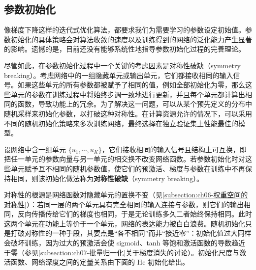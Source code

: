 \documentclass[../../main.tex]{subfiles}
\begin{document}
\subsection{参数初始化}\label{subsection:ch07-参数初始化}

像梯度下降这样的迭代式优化算法，都要求我们为需要学习的参数设定初始值。参数初始化的具体策略会对算法收敛的速度以及训练得到的网络的泛化能力产生显著的影响。遗憾的是，目前还没有能够系统性地指导参数初始化过程的完善理论。

尽管如此，在参数初始化过程中一个关键的考虑因素是对称性破缺（symmetry breaking）。考虑网络中的一组隐藏单元或输出单元，它们都接收相同的输入信号。如果这些单元的所有参数都被赋予了相同的值，例如全部初始化为零，那么这些单元的参数在训练过程中将始终步调一致地进行更新，并且每个单元都计算出相同的函数，导致功能上的冗余。为了解决这一问题，可以从某个预先定义的分布中随机采样来初始化参数，以打破这种对称性。在计算资源允许的情况下，可以采用不同的随机初始化策略来多次训练网络，最终选择在独立验证集上性能最佳的模型。

\begin{definition}[对称性破缺]\label{definition:ch07-对称性破缺}
设网络中含一组单元 $\{u_{1},\cdots,u_{K}\}$，它们接收相同的输入信号且结构上可互换，即把任一单元的参数向量与另一单元的相交换不改变网络函数。若参数初始化时对这些单元赋予互不相同的随机参数值，使它们的预激活、梯度与参数在训练中不再保持相同，则该初始化做法称为\textbf{对称性破缺}（symmetry breaking）。
\end{definition}

\begin{remark}
对称性的根源是网络函数对隐藏单元的置换不变（见\cref{subsection:ch06-权重空间的对称性}）：若同一层的两个单元具有完全相同的输入连接与参数，则它们的输出相同，反向传播传给它们的梯度也相同，于是无论训练多久二者始终保持相同。此时这两个单元在功能上等价于一个单元，网络的表达能力被白白浪费。随机初始化只是打破对称性的一种手段，其要点是“各不相同”而非“接近零”：初始化值过大同样会破坏训练，因为过大的预激活会使 sigmoid、tanh 等饱和激活函数的导数趋近于零（参见\cref{subsection:ch07-批量归一化}关于梯度消失的讨论）。初始化尺度与激活函数、网络深度之间的定量关系由下面的 He 初始化给出。
\end{remark}
\end{document}
